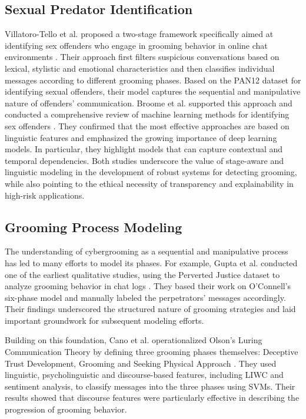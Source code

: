\subsection{Sexual Predator Identification}
Villatoro-Tello et al. proposed a two-stage framework specifically aimed at identifying sex offenders who engage in grooming behavior in online chat environments \parencite{villatoro2012two}. Their approach first filters suspicious conversations based on lexical, stylistic and emotional characteristics and then classifies individual messages according to different grooming phases. Based on the PAN12 dataset for identifying sexual offenders, their model captures the sequential and manipulative nature of offenders' communication. Broome et al. supported this approach and conducted a comprehensive review of machine learning methods for identifying sex offenders \parencite{broome2020psycholinguistic}. They confirmed that the most effective approaches are based on linguistic features and emphasized the growing importance of deep learning models. In particular, they highlight models that can capture contextual and temporal dependencies. Both studies underscore the value of stage-aware and linguistic modeling in the development of robust systems for detecting grooming, while also pointing to the ethical necessity of transparency and explainability in high-risk applications. %


\subsection{Grooming Process Modeling}


The understanding of cybergrooming as a sequential and manipulative process has led to many efforts to model its phases. For example, Gupta et al. conducted one of the earliest qualitative studies, using the Perverted Justice dataset to analyze grooming behavior in chat logs \parencite{gupta2012characterizingpedophileconversationsinternet}. They based their work on O'Connell's six-phase model and manually labeled the perpetrators' messages accordingly. Their findings underscored the structured nature of grooming strategies and laid important groundwork for subsequent modeling efforts. %

Building on this foundation, Cano et al. operationalized Olson's Luring Communication Theory by defining three grooming phases themselves: Deceptive Trust Development, Grooming and Seeking Physical Approach \parencite{Cano2014}. They used linguistic, psycholinguistic and discourse-based features, including LIWC and sentiment analysis, to classify messages into the three phases using SVMs. Their results showed that discourse features were particularly effective in describing the progression of grooming behavior.  %

